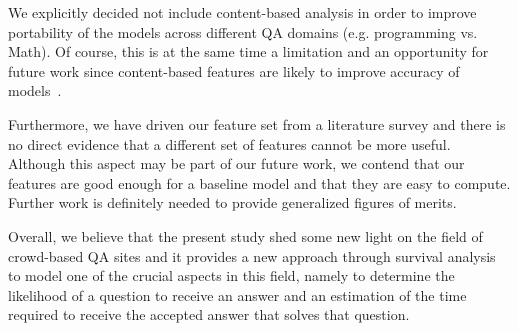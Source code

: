 \documentclass{chi2012}
\begin{document}
We explicitly decided not include content-based analysis in order to improve portability of the models across different QA domains (e.g. programming vs. Math). Of course, this is at the same time a limitation and an opportunity for future work since content-based features are likely to improve accuracy of models~\cite{nasehi2012}.

Furthermore, we have driven our feature set from a literature survey and there is no direct evidence that a different set of features cannot be more useful. Although this aspect may be part of our future work, we contend that our features are good enough for a baseline model and that they are easy to compute. Further work is definitely needed to provide 
generalized figures of merits.

Overall, we believe that the present study shed some new light on the field of crowd-based QA sites and it provides a new approach through survival analysis to model one of the crucial aspects in this field, namely to determine the likelihood of a question to receive an answer and an estimation of the time required to receive the accepted answer that solves that question.

\balance



\end{document}
